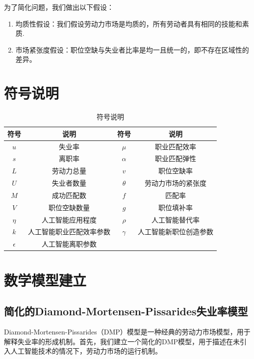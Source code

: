 \documentclass{article}
\begin{document}
为了简化问题，我们做出以下假设：

\begin{enumerate}[label=(\arabic*)]
    \item 均质性假设：我们假设劳动力市场是均质的，所有劳动者具有相同的技能和素质.
    \item 市场紧张度假设：职位空缺与失业者比率是均一且统一的，即不存在区域性的差异。 
\end{enumerate}

\section{符号说明}

\begin{table}[H]
    \centering
    \begin{tabular}{cccc}
        \toprule
        符号 & 说明 & 符号 & 说明 \\
        \midrule
        $u$ & 失业率 & $\mu$ & 职业匹配效率 \\
        $s$ & 离职率 & $\alpha$ & 职业匹配弹性 \\
        $L$ & 劳动力总量 & $v$ & 职位空缺率 \\
        $U$ & 失业者数量 & $\theta$ & 劳动力市场的紧张度 \\
        $M$ & 成功匹配数 & $f$ & 匹配率\\
        $V$ & 职位空缺数量 & $g$ & 职位填补率 \\
        $\eta$ & 人工智能应用程度 & $\rho$ & 人工智能替代率 \\
        $k$ & 人工智能职业匹配效率参数 & $\gamma$ & 人工智能新职位创造参数 \\
        $\epsilon$ & 人工智能离职参数 & & \\
        \bottomrule
    \end{tabular}
    \caption{符号说明}
\end{table}

\section{数学模型建立}

\subsection{简化的Diamond-Mortensen-Pissarides失业率模型}

Diamond-Mortensen-Pissarides（DMP）模型\cite{diamond1982aggregate}\cite{mortensen1982property}是一种经典的劳动力市场模型，用于解释失业率的形成机制。首先，我们建立一个简化的DMP模型，用于描述在未引入人工智能技术的情况下，劳动力市场的运行机制。
\end{document}
